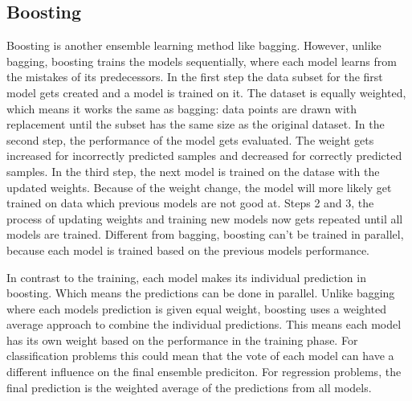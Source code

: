 
\subsection{Boosting}
Boosting \citep{Schapire1990} is another ensemble learning method like bagging.
However, unlike bagging, boosting trains the models sequentially, where each
model learns from the mistakes of its predecessors.
In the first step the data subset for the first model gets created and a model 
is trained on it. The dataset is equally weighted, which means it works the same 
as bagging: data points are drawn with replacement until the subset has the same
size as the original dataset.
In the second step, the performance of the model gets evaluated. The weight gets
increased for incorrectly predicted samples and decreased for correctly predicted
samples. 
In the third step, the next model is trained on the datase with the updated weights.
Because of the weight change, the model will more likely get trained on data which
previous models are not good at.
Steps 2 and 3, the process of updating weights and training new models now gets 
repeated until all models are trained.
Different from bagging, boosting can't be trained in parallel, because each model
is trained based on the previous models performance. 


In contrast to the training, each model makes its individual prediction in boosting.
Which means the predictions can be done in parallel.
Unlike bagging where each models prediction is given equal weight, boosting uses
a weighted average approach to combine the individual predictions. This means
each model has its own weight based on the performance in the training phase.
For classification problems this could mean that the vote of each model can have
a different influence on the final ensemble prediciton.
For regression problems, the final prediction is the weighted average of the
predictions from all models.


